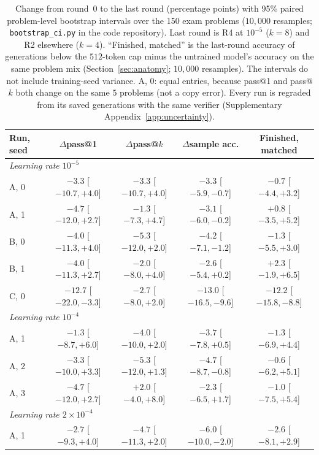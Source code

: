 \documentclass[runningheads]{llncs}
\begin{document}
\begin{table}[!htb]
\caption{Change from round~0 to the last round (percentage points) with 95\%
paired problem-level bootstrap intervals over the 150 exam problems
($10{,}000$ resamples; \texttt{bootstrap\_ci.py} in the code repository). Last round
is R4 at $10^{-5}$ ($k=8$) and R2 elsewhere ($k=4$). ``Finished, matched'' is
the last-round accuracy of generations below the $512$-token cap minus the
untrained model's accuracy on the same problem mix (Section~\ref{sec:anatomy};
$10{,}000$ resamples). The
intervals do not include training-seed variance. A, 0: equal entries, because pass@1 and pass@$k$ both change on the same $5$ problems (not a copy error). Every run is regraded from its saved
generations with the same verifier (Supplementary Appendix~\ref{app:uncertainty}).}
\label{tab:ci}
\centering
\scriptsize
\setlength{\tabcolsep}{1.5pt}
\begin{tabular}{lcccc}
\toprule
Run, seed & $\Delta$pass@1 & $\Delta$pass@$k$ & $\Delta$sample acc. & Finished, matched \\
\midrule
\multicolumn{5}{l}{\emph{Learning rate $10^{-5}$}} \\
A, 0 & $-3.3$ [$-10.7,+4.0$] & $-3.3$ [$-10.7,+4.0$] & $-3.3$ [$-5.9,-0.7$] & $-0.7$ [$-4.4,+3.2$] \\
A, 1 & $-4.7$ [$-12.0,+2.7$] & $-1.3$ [$-7.3,+4.7$] & $-3.1$ [$-6.0,-0.2$] & $+0.8$ [$-3.5,+5.2$] \\
B, 0 & $-4.0$ [$-11.3,+4.0$] & $-5.3$ [$-12.0,+2.0$] & $-4.2$ [$-7.1,-1.2$] & $-1.3$ [$-5.5,+3.0$] \\
B, 1 & $-4.0$ [$-11.3,+2.7$] & $-2.0$ [$-8.0,+4.0$] & $-2.6$ [$-5.4,+0.2$] & $+2.3$ [$-1.9,+6.5$] \\
C, 0 & $-12.7$ [$-22.0,-3.3$] & $-2.7$ [$-8.0,+2.0$] & $-13.0$ [$-16.5,-9.6$] & $-12.2$ [$-15.8,-8.8$] \\
\midrule
\multicolumn{5}{l}{\emph{Learning rate $10^{-4}$}} \\
A, 1 & $-1.3$ [$-8.7,+6.0$] & $-4.0$ [$-10.0,+2.0$] & $-3.7$ [$-7.8,+0.5$] & $-1.3$ [$-6.9,+4.4$] \\
A, 2 & $-3.3$ [$-10.0,+3.3$] & $-5.3$ [$-12.0,+1.3$] & $-4.7$ [$-8.7,-0.8$] & $-0.6$ [$-6.2,+5.1$] \\
A, 3 & $-4.7$ [$-12.0,+2.7$] & $+2.0$ [$-4.0,+8.0$] & $-2.3$ [$-6.5,+1.7$] & $-1.0$ [$-7.5,+5.4$] \\
\midrule
\multicolumn{5}{l}{\emph{Learning rate $2\!\times\!10^{-4}$}} \\
A, 1 & $-2.7$ [$-9.3,+4.0$] & $-4.7$ [$-11.3,+2.0$] & $-6.0$ [$-10.0,-2.0$] & $-2.6$ [$-8.1,+2.9$] \\

\end{tabular}
\end{table}
\end{document}
